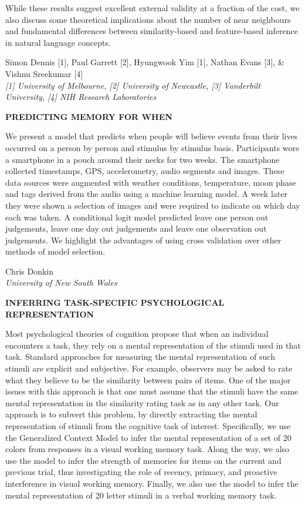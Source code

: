 \documentclass[]{article}
\begin{document}
While these results suggest excellent external validity at a fraction of
the cost, we also discuss some theoretical implications about the number
of near neighbours and fundamental differences between similarity-based
and feature-based inference in natural language concepts.\\
\pagebreak  

Simon Dennis {[}1{]}, Paul Garrett {[}2{]}, Hyungwook Yim {[}1{]},
Nathan Evans {[}3{]}, \& Vishnu Sreekumar {[}4{]}\\
\emph{{[}1{]} University of Melbourne, {[}2{]} University of Newcastle,
{[}3{]} Vanderbilt University, {[}4{]} NIH Research Laboratories}

\textbf{PREDICTING MEMORY FOR WHEN}

We present a model that predicts when people will believe events from
their lives occurred on a person by person and stimulus by stimulus
basis. Participants wore a smartphone in a pouch around their necks for
two weeks. The smartphone collected timestamps, GPS, accelerometry,
audio segments and images. These data sources were augmented with
weather conditions, temperature, moon phase and tags derived from the
audio using a machine learning model. A week later they were shown a
selection of images and were required to indicate on which day each was
taken. A conditional logit model predicted leave one person out
judgements, leave one day out judgements and leave one observation out
judgements. We highlight the advantages of using cross validation over
other methods of model selection.\\
\pagebreak  

Chris Donkin\\
\emph{University of New South Wales}

\textbf{INFERRING TASK-SPECIFIC PSYCHOLOGICAL REPRESENTATION}

Most psychological theories of cognition propose that when an individual
encounters a task, they rely on a mental representation of the stimuli
used in that task. Standard approaches for measuring the mental
representation of such stimuli are explicit and subjective. For example,
observers may be asked to rate what they believe to be the similarity
between pairs of items. One of the major issues with this approach is
that one must assume that the stimuli have the same mental
representation in the similarity rating task as in any other task. Our
approach is to subvert this problem, by directly extracting the mental
representation of stimuli from the cognitive task of interest.
Specifically, we use the Generalized Context Model to infer the mental
representation of a set of 20 colors from responses in a visual working
memory task. Along the way, we also use the model to infer the strength
of memories for items on the current and previous trial, thus
investigating the role of recency, primacy, and proactive interference
in visual working memory. Finally, we also use the model to infer the
mental representation of 20 letter stimuli in a verbal working memory
task.\\
\pagebreak  
\end{document}
